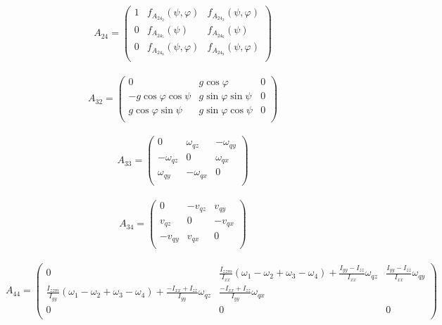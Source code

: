 \begin{equation}
A_{24}=\left(\begin{array}{ccc}
1 & f_{A_{24_2}}(\psi,\varphi) & f_{A_{24_3}}(\psi,\varphi) \\
0 & f_{A_{24_5}}(\psi) & f_{A_{24_6}}(\psi) \\
0&f_{A_{24_8}}(\psi,\varphi)&f_{A_{24_9}}(\psi,\varphi)\\
\end{array}\right)
\end{equation}\\

\begin{equation}
A_{32}=\left(\begin{array}{ccc}
0 & g\cos \varphi & 0 \\
-g\cos \varphi \cos \psi & g\sin\varphi\sin\psi & 0 \\
 g\cos \varphi \sin \psi & g\sin\varphi\cos\psi & 0 \\
\end{array}\right)
\end{equation}\\

\begin{equation}
A_{33}=\left(\begin{array}{ccc}
0 & \omega_{qz} & -\omega_{qy} \\
-\omega_{qz} & 0 &\omega_{qx} \\
\omega_{qy} & -\omega_{qx}& 0 \\
\end{array}\right)
\end{equation}\\

\begin{equation}
A_{34}=\left(\begin{array}{ccc}
0 & -v_{qz} & v_{qy} \\
v_{qz} & 0 &-v_{qx} \\
-v_{qy} & v_{qx}& 0 \\
\end{array}\right)
\end{equation}\\

\begin{equation}
A_{44}=\left(\begin{array}{ccc}
0 &\frac{I_{zzm}}{I_{xx}}(\omega_1-\omega_2+\omega_3-\omega_4) + \frac{I_{yy}-I_{zz}}{I_{xx}}\omega_{qz}& \frac{I_{yy}-I_{zz}}{I_{xx}}\omega_{qy} \\
\frac{I_{zzm}}{I_{yy}}(\omega_1-\omega_2+\omega_3-\omega_4) + \frac{-I_{xx}+I_{zz}}{I_{yy}}\omega_{qz} & \frac{-I_{xx}+I_{zz}}{I_{yy}}\omega_{qx}\\
0&0&0\\
\end{array}\right)
\end{equation}\\


